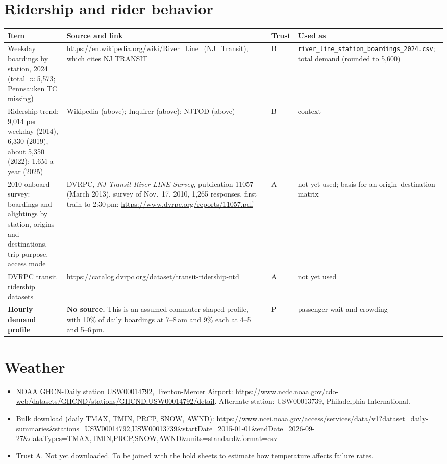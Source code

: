 \documentclass[11pt]{article}
\begin{document}
\section{Ridership and rider behavior}

\begin{longtable}{@{}p{3.3cm}p{7.8cm}p{1.0cm}p{2.6cm}@{}}
\toprule
Item & Source and link & Trust & Used as \\
\midrule
\endhead
Weekday boardings by station, 2024 (total $\approx$5{,}573; Pennsauken TC missing) &
\url{https://en.wikipedia.org/wiki/River_Line_(NJ_Transit)}, which cites NJ TRANSIT &
B & \nolinkurl{river_line_station_boardings_2024.csv}; total demand (rounded to 5{,}600) \\
Ridership trend: 9{,}014 per weekday (2014), 6{,}330 (2019), about 5{,}350 (2022); 1.6M a year (2025) &
Wikipedia (above); Inquirer (above); NJTOD (above) &
B & context \\
2010 onboard survey: boardings and alightings by station, origins and destinations, trip purpose, access mode &
DVRPC, \emph{NJ Transit River LINE Survey}, publication 11057 (March 2013), survey of Nov.~17, 2010, 1{,}265 responses, first train to 2:30\,pm: \url{https://www.dvrpc.org/reports/11057.pdf} &
A & not yet used; basis for an origin--destination matrix \\
DVRPC transit ridership datasets &
\url{https://catalog.dvrpc.org/dataset/transit-ridership-ntd} &
A & not yet used \\
\textbf{Hourly demand profile} &
\textbf{No source.} This is an assumed commuter-shaped profile, with 10\% of daily boardings at 7--8\,am and 9\% each at 4--5 and 5--6\,pm. &
P & passenger wait and crowding \\
\bottomrule
\end{longtable}

\section{Weather}
\begin{itemize}
\item NOAA GHCN-Daily station USW00014792, Trenton-Mercer Airport: \url{https://www.ncdc.noaa.gov/cdo-web/datasets/GHCND/stations/GHCND:USW00014792/detail}. Alternate station: USW00013739, Philadelphia International.
\item Bulk download (daily TMAX, TMIN, PRCP, SNOW, AWND): \url{https://www.ncei.noaa.gov/access/services/data/v1?dataset=daily-summaries&stations=USW00014792,USW00013739&startDate=2015-01-01&endDate=2026-09-27&dataTypes=TMAX,TMIN,PRCP,SNOW,AWND&units=standard&format=csv}
\item Trust A. Not yet downloaded. To be joined with the hold sheets to estimate how temperature affects failure rates.
\end{itemize}
\end{document}
